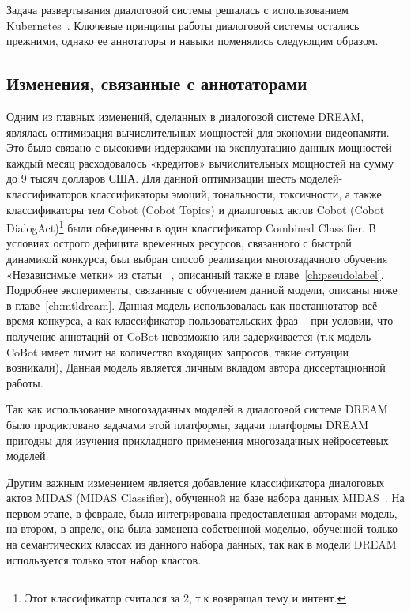 Задача развертывания диалоговой системы решалась с использованием Kubernetes~\cite{kubernetes}.
Ключевые принципы работы диалоговой системы остались прежними, однако ее аннотаторы и навыки поменялись следующим образом.

\subsection{Изменения, связанные с аннотаторами}\label{dream:2:ann}

Одним из главных изменений, сделанных в диалоговой системе DREAM, являлась оптимизация вычислительных мощностей для экономии видеопамяти. Это было связано с высокими издержками на эксплуатацию данных мощностей -- каждый месяц расходовалось «кредитов» вычислительных мощностей на сумму до 9 тысяч долларов США. Для данной оптимизации шесть моделей-классификаторов:классификаторы эмоций, тональности, токсичности, а также классификаторы тем Cobot (Cobot Topics) и диалоговых актов Cobot (Cobot DialogAct)\footnote{Этот классификатор считался за 2, т.к возвращал тему и интент.} были объединены в один классификатор Combined Classifier. В условиях острого дефицита временных ресурсов, связанного с быстрой динамикой конкурса, был выбран способ реализации многозадачного обучения «Независимые метки» из статьи ~\cite{pseudolabel}, описанный также в главе~\ref{ch:pseudolabel}. Подробнее эксперименты, связанные с обучением данной модели, описаны ниже в главе~\ref{ch:mtldream}. Данная модель использовалась как постаннотатор всё время конкурса, а как классификатор пользовательских фраз -- при условии, что получение аннотаций от CoBot невозможно или задерживается (т.к модель CoBot имеет лимит на количество входящих запросов, такие ситуации возникали),  Данная модель является личным вкладом автора диссертационной работы.

Так как использование многозадачных моделей в диалоговой системе DREAM было продиктовано задачами этой платформы, задачи платформы DREAM пригодны для изучения прикладного применения многозадачных нейросетевых моделей.

Другим важным изменением является добавление классификатора диалоговых актов MIDAS (MIDAS Classifier), обученной на базе набора данных MIDAS~\cite{midas}. На первом этапе, в феврале, была интегрирована предоставленная авторами модель, на втором, в апреле, она была заменена собственной моделью, обученной только на семантических классах из данного набора данных, так как в модели {DREAM} используется только этот набор классов.


